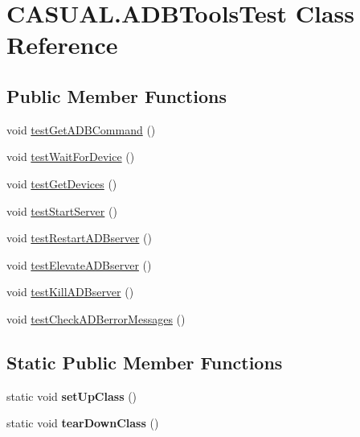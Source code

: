 \hypertarget{classCASUAL_1_1ADBToolsTest}{\section{C\-A\-S\-U\-A\-L.\-A\-D\-B\-Tools\-Test Class Reference}
\label{classCASUAL_1_1ADBToolsTest}
}
\subsection*{Public Member Functions}
\begin{DoxyCompactItemize}
\item 
void \hyperlink{classCASUAL_1_1ADBToolsTest_a26de48cdee7841ec5b2cd395a9c5441f}{test\-Get\-A\-D\-B\-Command} ()
\item 
void \hyperlink{classCASUAL_1_1ADBToolsTest_adfc5b71fef8031fa6d1729cb84ed148e}{test\-Wait\-For\-Device} ()
\item 
void \hyperlink{classCASUAL_1_1ADBToolsTest_a122b5797dab19bdbf9f66b5ce7643760}{test\-Get\-Devices} ()
\item 
void \hyperlink{classCASUAL_1_1ADBToolsTest_a8df7a474834affb30d2636477e2cb82f}{test\-Start\-Server} ()
\item 
void \hyperlink{classCASUAL_1_1ADBToolsTest_a8f63ca79fb2864fe736b1d8a5d0670e1}{test\-Restart\-A\-D\-Bserver} ()
\item 
void \hyperlink{classCASUAL_1_1ADBToolsTest_ad902cea7c7d28b59dcbc3132d6a17c6f}{test\-Elevate\-A\-D\-Bserver} ()
\item 
void \hyperlink{classCASUAL_1_1ADBToolsTest_ac400307ee677518e5061246d14e34545}{test\-Kill\-A\-D\-Bserver} ()
\item 
void \hyperlink{classCASUAL_1_1ADBToolsTest_a083287871bae73cf18eef1a44dd98e61}{test\-Check\-A\-D\-Berror\-Messages} ()
\end{DoxyCompactItemize}
\subsection*{Static Public Member Functions}
\begin{DoxyCompactItemize}
\item 
\hypertarget{classCASUAL_1_1ADBToolsTest_a39fd86626df363f02a9e8d7fd934e03d}{static void {\bfseries set\-Up\-Class} ()}\label{classCASUAL_1_1ADBToolsTest_a39fd86626df363f02a9e8d7fd934e03d}

\item 
\hypertarget{classCASUAL_1_1ADBToolsTest_a2fc5ba881d67b4305199f2e151bec106}{static void {\bfseries tear\-Down\-Class} ()}\label{classCASUAL_1_1ADBToolsTest_a2fc5ba881d67b4305199f2e151bec106}

\end{DoxyCompactItemize}


